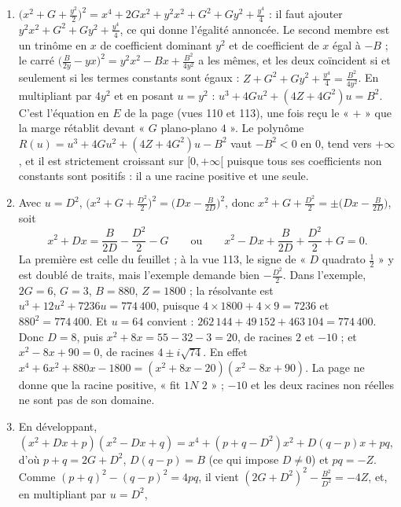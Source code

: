\documentclass[11pt,a4paper]{article}
\begin{document}
\begin{solution}
\begin{enumerate}
\item $\bigl(x^2 + G + \frac{y^2}{2}\bigr)^2 = x^4 + 2Gx^2 + y^2x^2 + G^2 + Gy^2 +
  \frac{y^4}{4}$ : il faut ajouter $y^2x^2 + G^2 + Gy^2 + \frac{y^4}{4}$, ce qui donne
  l'égalité annoncée. Le second membre est un trinôme en $x$ de coefficient
  dominant $y^2$ et de coefficient de $x$ égal à $-B$ ; le carré
  $\bigl(\frac{B}{2y} - yx\bigr)^2 = y^2x^2 - Bx + \frac{B^2}{4y^2}$ a les mêmes, et
  les deux coïncident si et seulement si les termes constants sont égaux :
  $Z + G^2 + Gy^2 + \frac{y^4}{4} = \frac{B^2}{4y^2}$. En multipliant par $4y^2$ et
  en posant $u = y^2$ : $u^3 + 4Gu^2 + (4Z + 4G^2)u = B^2$. C'est l'équation en $E$
  de la page (vues 110 et 113), une fois reçu le « $+$ » que la marge rétablit
  devant « $G$ plano-plano $4$ ». Le polynôme
  $R(u) = u^3 + 4Gu^2 + (4Z + 4G^2)u - B^2$ vaut $-B^2 < 0$ en $0$, tend vers
  $+\infty$, et il est strictement croissant sur $[0, +\infty[$ puisque tous ses
  coefficients non constants sont positifs : il a une racine positive et une seule.
\item Avec $u = D^2$, $\bigl(x^2 + G + \frac{D^2}{2}\bigr)^2 =
  \bigl(Dx - \frac{B}{2D}\bigr)^2$, donc
  $x^2 + G + \frac{D^2}{2} = \pm\bigl(Dx - \frac{B}{2D}\bigr)$, soit
  \[
  x^2 + Dx = \frac{B}{2D} - \frac{D^2}{2} - G
  \qquad\text{ou}\qquad
  x^2 - Dx + \frac{B}{2D} + \frac{D^2}{2} + G = 0 .
  \]
  La première est celle du feuillet ; à la vue 113, le signe de « $D$ quadrato
  $\frac12$ » y est doublé de traits, mais l'exemple demande bien $-\frac{D^2}{2}$.
  Dans l'exemple, $2G = 6$, $G = 3$, $B = 880$, $Z = 1800$ ; la résolvante est
  $u^3 + 12u^2 + 7236u = 774\,400$, puisque $4 \times 1800 + 4 \times 9 = 7236$ et
  $880^2 = 774\,400$. Et $u = 64$ convient :
  $262\,144 + 49\,152 + 463\,104 = 774\,400$. Donc $D = 8$, puis
  $x^2 + 8x = 55 - 32 - 3 = 20$, de racines $2$ et $-10$ ; et
  $x^2 - 8x + 90 = 0$, de racines $4 \pm i\sqrt{74}$. En effet
  $x^4 + 6x^2 + 880x - 1800 = (x^2 + 8x - 20)(x^2 - 8x + 90)$. La page ne donne que
  la racine positive, « fit $1N$ $2$ » ; $-10$ et les deux racines non réelles ne
  sont pas de son domaine.
\item En développant,
  $(x^2 + Dx + p)(x^2 - Dx + q) = x^4 + (p + q - D^2)x^2 + D(q - p)x + pq$, d'où
  $p + q = 2G + D^2$, $D(q - p) = B$ (ce qui impose $D \neq 0$) et $pq = -Z$. Comme
  $(p + q)^2 - (q - p)^2 = 4pq$, il vient
  $(2G + D^2)^2 - \frac{B^2}{D^2} = -4Z$, et, en multipliant par $u = D^2$,

\end{enumerate}
\end{solution}
\end{document}
